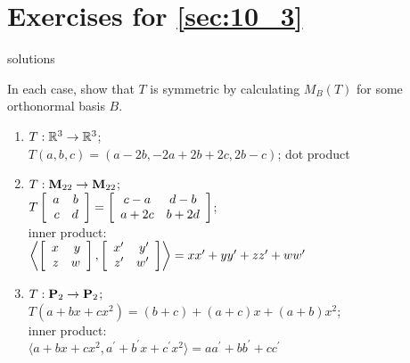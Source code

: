 \section*{Exercises for \ref{sec:10_3}}

\begin{Filesave}{solutions}
\end{Filesave}

\begin{multicols}{2}
\begin{ex}
In each case, show that $T$ is symmetric by calculating $M_{B}(T)$ for some orthonormal basis $B$.

\begin{enumerate}[leftmargin=1em, label={\alph*.}]
\item $T : \mathbb{R}^3 \to \mathbb{R}^3$; \\ $T(a, b, c) = (a - 2b, -2a + 2b + 2c, 2b - c)$; dot product

\item $T : \textbf{M}_{22} \to \textbf{M}_{22}$; \\
$T \left[ \begin{array}{rr}
a & b \\
c & d
\end{array} \right]
=
\left[ \begin{array}{cc}
c - a & d - b \\
a + 2c & b + 2d
\end{array} \right]$; \\ inner product:\\ $\left\langle \left[ \begin{array}{rr}
x & y \\
z & w \end{array}\right], \left[ \begin{array}{rr}
x^{\prime} & y^{\prime} \\
z^{\prime} & w^{\prime} \end{array}\right] \right\rangle = xx^{\prime} + yy^{\prime}+zz^{\prime} + ww^{\prime}$

\item $T : \textbf{P}_2 \to \textbf{P}_2$; \\ $T(a + bx + cx^2) = (b + c) + (a + c)x + (a + b)x^2$; \\ inner product:\\ $\langle a + bx + cx^2, a^\prime + b^\prime x + c^\prime x^2 \rangle = aa^\prime + bb^\prime + cc^ \prime$


\end{enumerate}
\end{ex}
\end{multicols}
